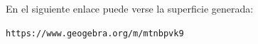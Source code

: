 En el siguiente enlace puede verse la superficie generada:


\begin{center}
	\verb"https://www.geogebra.org/m/mtnbpvk9"
\end{center}



%
%

